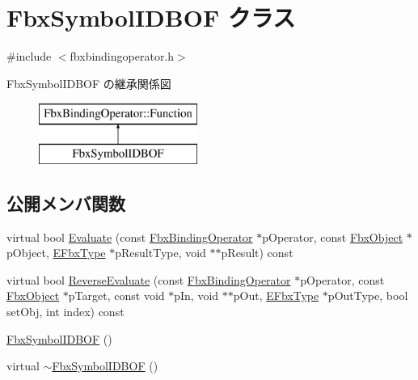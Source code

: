 \hypertarget{class_fbx_symbol_i_d_b_o_f}{}\section{Fbx\+Symbol\+I\+D\+B\+OF クラス}
\label{class_fbx_symbol_i_d_b_o_f}


{\ttfamily \#include $<$fbxbindingoperator.\+h$>$}

Fbx\+Symbol\+I\+D\+B\+OF の継承関係図\begin{figure}[H]
\begin{center}
\leavevmode
\includegraphics[height=2.000000cm]{class_fbx_symbol_i_d_b_o_f}
\end{center}
\end{figure}
\subsection*{公開メンバ関数}
\begin{DoxyCompactItemize}
\item 
virtual bool \hyperlink{class_fbx_symbol_i_d_b_o_f_a2cb2538884cf58d68a0ee37fbf910cea}{Evaluate} (const \hyperlink{class_fbx_binding_operator}{Fbx\+Binding\+Operator} $\ast$p\+Operator, const \hyperlink{class_fbx_object}{Fbx\+Object} $\ast$p\+Object, \hyperlink{fbxpropertytypes_8h_a73913a5ddfb20e57c6f25e9e6784bd92}{E\+Fbx\+Type} $\ast$p\+Result\+Type, void $\ast$$\ast$p\+Result) const
\item 
virtual bool \hyperlink{class_fbx_symbol_i_d_b_o_f_a2d4eee3d2a4fbf9790b2491ed33846b3}{Reverse\+Evaluate} (const \hyperlink{class_fbx_binding_operator}{Fbx\+Binding\+Operator} $\ast$p\+Operator, const \hyperlink{class_fbx_object}{Fbx\+Object} $\ast$p\+Target, const void $\ast$p\+In, void $\ast$$\ast$p\+Out, \hyperlink{fbxpropertytypes_8h_a73913a5ddfb20e57c6f25e9e6784bd92}{E\+Fbx\+Type} $\ast$p\+Out\+Type, bool set\+Obj, int index) const
\item 
\hyperlink{class_fbx_symbol_i_d_b_o_f_a45254540be4b921c3aaad8047666df1a}{Fbx\+Symbol\+I\+D\+B\+OF} ()
\item 
virtual \hyperlink{class_fbx_symbol_i_d_b_o_f_aec3c76be513ae86eb878c1d7bd3f0847}{$\sim$\+Fbx\+Symbol\+I\+D\+B\+OF} ()
\end{DoxyCompactItemize}
